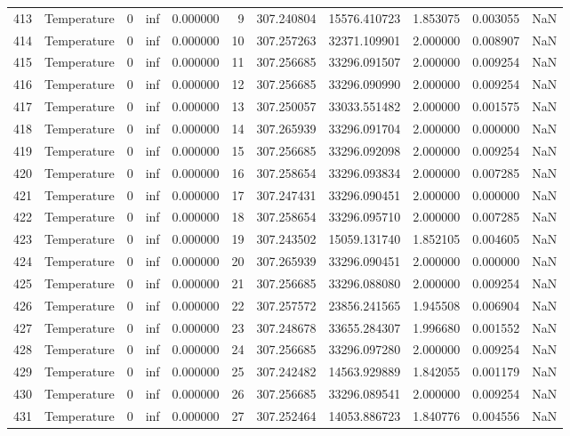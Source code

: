 \begin{tabular}{llrrrrrrrrr}
413 & Temperature & 0 & inf & 0.000000 & 9 & 307.240804 & 15576.410723 & 1.853075 & 0.003055 & NaN \\
414 & Temperature & 0 & inf & 0.000000 & 10 & 307.257263 & 32371.109901 & 2.000000 & 0.008907 & NaN \\
415 & Temperature & 0 & inf & 0.000000 & 11 & 307.256685 & 33296.091507 & 2.000000 & 0.009254 & NaN \\
416 & Temperature & 0 & inf & 0.000000 & 12 & 307.256685 & 33296.090990 & 2.000000 & 0.009254 & NaN \\
417 & Temperature & 0 & inf & 0.000000 & 13 & 307.250057 & 33033.551482 & 2.000000 & 0.001575 & NaN \\
418 & Temperature & 0 & inf & 0.000000 & 14 & 307.265939 & 33296.091704 & 2.000000 & 0.000000 & NaN \\
419 & Temperature & 0 & inf & 0.000000 & 15 & 307.256685 & 33296.092098 & 2.000000 & 0.009254 & NaN \\
420 & Temperature & 0 & inf & 0.000000 & 16 & 307.258654 & 33296.093834 & 2.000000 & 0.007285 & NaN \\
421 & Temperature & 0 & inf & 0.000000 & 17 & 307.247431 & 33296.090451 & 2.000000 & 0.000000 & NaN \\
422 & Temperature & 0 & inf & 0.000000 & 18 & 307.258654 & 33296.095710 & 2.000000 & 0.007285 & NaN \\
423 & Temperature & 0 & inf & 0.000000 & 19 & 307.243502 & 15059.131740 & 1.852105 & 0.004605 & NaN \\
424 & Temperature & 0 & inf & 0.000000 & 20 & 307.265939 & 33296.090451 & 2.000000 & 0.000000 & NaN \\
425 & Temperature & 0 & inf & 0.000000 & 21 & 307.256685 & 33296.088080 & 2.000000 & 0.009254 & NaN \\
426 & Temperature & 0 & inf & 0.000000 & 22 & 307.257572 & 23856.241565 & 1.945508 & 0.006904 & NaN \\
427 & Temperature & 0 & inf & 0.000000 & 23 & 307.248678 & 33655.284307 & 1.996680 & 0.001552 & NaN \\
428 & Temperature & 0 & inf & 0.000000 & 24 & 307.256685 & 33296.097280 & 2.000000 & 0.009254 & NaN \\
429 & Temperature & 0 & inf & 0.000000 & 25 & 307.242482 & 14563.929889 & 1.842055 & 0.001179 & NaN \\
430 & Temperature & 0 & inf & 0.000000 & 26 & 307.256685 & 33296.089541 & 2.000000 & 0.009254 & NaN \\
431 & Temperature & 0 & inf & 0.000000 & 27 & 307.252464 & 14053.886723 & 1.840776 & 0.004556 & NaN \\

\end{tabular}
